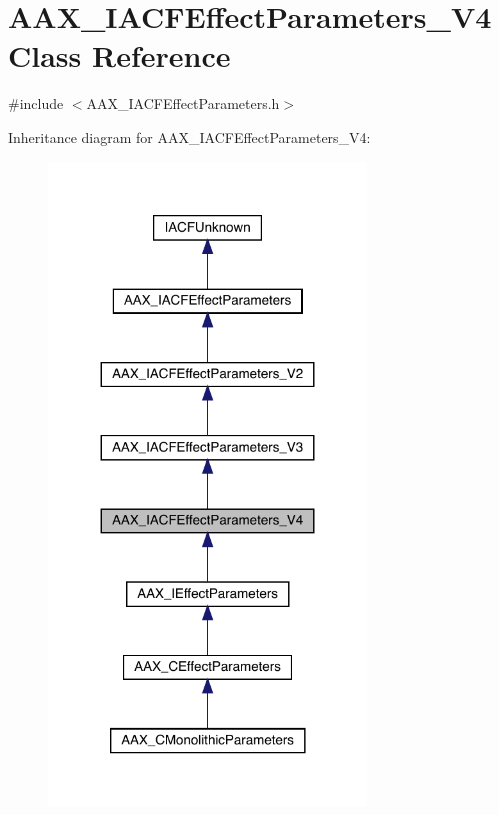 \hypertarget{a01685}{}\section{A\+A\+X\+\_\+\+I\+A\+C\+F\+Effect\+Parameters\+\_\+\+V4 Class Reference}
\label{a01685}


{\ttfamily \#include $<$A\+A\+X\+\_\+\+I\+A\+C\+F\+Effect\+Parameters.\+h$>$}



Inheritance diagram for A\+A\+X\+\_\+\+I\+A\+C\+F\+Effect\+Parameters\+\_\+\+V4\+:
\nopagebreak
\begin{figure}[H]
\begin{center}
\leavevmode
\includegraphics[width=239pt]{a01684}
\end{center}
\end{figure}


